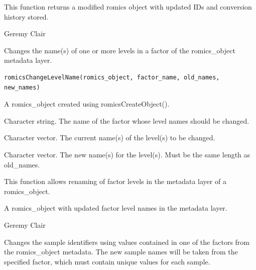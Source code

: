 \documentclass[a4paper]{book}
\begin{document}
%
\begin{Value}
This function returns a modified romics object with updated IDs and conversion history stored.
\end{Value}
%
\begin{Author}
Geremy Clair
\end{Author}
%
\begin{Description}
Changes the name(s) of one or more levels in a factor of the romics\_object metadata layer.
\end{Description}
%
\begin{Usage}
\begin{verbatim}
romicsChangeLevelName(romics_object, factor_name, old_names, new_names)
\end{verbatim}
\end{Usage}
%
\begin{Arguments}
\begin{ldescription}
\item[\code{romics\_object}] A romics\_object created using romicsCreateObject().

\item[\code{factor\_name}] Character string. The name of the factor whose level names should be changed.

\item[\code{old\_names}] Character vector. The current name(s) of the level(s) to be changed.

\item[\code{new\_names}] Character vector. The new name(s) for the level(s). Must be the same length as old\_names.
\end{ldescription}
\end{Arguments}
%
\begin{Details}
This function allows renaming of factor levels in the metadata layer of a romics\_object.
\end{Details}
%
\begin{Value}
A romics\_object with updated factor level names in the metadata layer.
\end{Value}
%
\begin{Author}
Geremy Clair
\end{Author}
%
\begin{Description}
Changes the sample identifiers using values contained in one of the factors from the romics\_object metadata.
The new sample names will be taken from the specified factor, which must contain unique values for each sample.
\end{Description}
\end{document}
